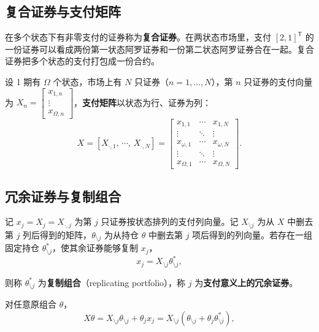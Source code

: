 \subsection{复合证券与支付矩阵}
\begin{tcolorbox}[knowledge,title=复合证券]
在多个状态下有非零支付的证券称为\textbf{复合证券}。在两状态市场里，支付 $[2,1]^{\mathsf T}$ 的一份证券可以看成两份第一状态阿罗证券和一份第二状态阿罗证券合在一起。复合证券把多个状态的支付打包成一份合约。
\end{tcolorbox}
\begin{tcolorbox}[knowledge,title=支付矩阵与行列约定]
设 1 期有 $\Omega$ 个状态，市场上有 $N$ 只证券（$n=1,\dots,N$），第 $n$ 只证券的支付向量为 $X_n=\begin{bmatrix}x_{1,n} \\ \vdots \\ x_{\Omega,n}\end{bmatrix}$，\textbf{支付矩阵}以状态为行、证券为列：
\[
    X=[X_{\cdot,1},\,\cdots,\,X_{\cdot,N}]=
    \begin{bmatrix}
        x_{1,1}   & \cdots & x_{1,N}   \\
        \vdots    & \ddots & \vdots    \\
        x_{\omega,1} & \cdots & x_{\omega,N} \\
        \vdots    & \ddots & \vdots    \\
        x_{\Omega,1} & \cdots & x_{\Omega,N}
    \end{bmatrix}.
\]
\end{tcolorbox}

\subsection{冗余证券与复制组合}
\begin{tcolorbox}[knowledge,title=冗余证券]
记 $x_j=X_j=X_{\cdot,j}$ 为第 $j$ 只证券按状态排列的支付列向量。记 $X_{\setminus j}$ 为从 $X$ 中删去第 $j$ 列后得到的矩阵，$\theta_{\setminus j}$ 为从持仓 $\theta$ 中删去第 $j$ 项后得到的列向量。若存在一组固定持仓 $\theta^*_{\setminus j}$，使其余证券能够复制 $x_j$，
\[
    x_j=X_{\setminus j}\theta^*_{\setminus j},
\]

则称 $\theta^*_{\setminus j}$ 为\textbf{复制组合}（replicating portfolio），称 $j$ 为\textbf{支付意义上的冗余证券}。
\end{tcolorbox}
对任意原组合 $\theta$，
\[
 X\theta=X_{\setminus j}\theta_{\setminus j}+\theta_jx_j
 =X_{\setminus j}(\theta_{\setminus j}+\theta_j\theta^*_{\setminus j}),
\]

